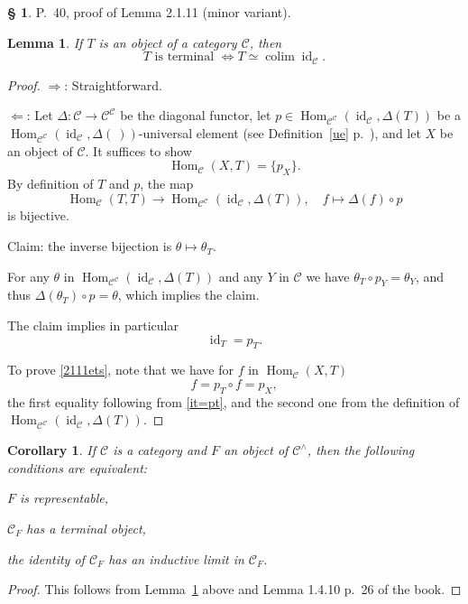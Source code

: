 \documentclass[12pt]{article}
\newtheorem{lem}[thm]{Lemma}
\newtheorem{cor}[thm]{Corollary}
\theoremstyle{remark}
\theoremstyle{definition}
\newtheorem{s}[thm]{\S}
\newcommand{\nn}{\noindent}
\newcommand{\C}{\mathcal C}
\newcommand{\si}{\Leftarrow}
\newcommand{\ssi}{\Leftrightarrow}
\newcommand{\then}{\Rightarrow}
\DeclareMathOperator*{\colim}{colim}
\DeclareMathOperator{\id}{id}
\DeclareMathOperator{\Hom}{Hom}
\begin{document}
\begin{s} 
P.~40, proof of Lemma 2.1.11 (minor variant).

\begin{lem}\label{l2111}
If $T$ is an object of a category $\C$, then 
$$
T\text{ is terminal }\ssi T\simeq\colim\id_\C.
$$
\end{lem}

\begin{proof} $\then$: Straightforward.

\nn$\si$: Let $\Delta:\C\to\C^\C$ be the diagonal functor, let $p\in\Hom_{\C^\C}(\id_\C,\Delta(T))$ be a $\Hom_{\C^\C}(\id_\C,\Delta(\ ))$\--universal element  (see Definition~\ref{ue} p.~\pageref{ue}), and let $X$ be an object of $\C$. It suffices to show 
%
\begin{equation}\label{2111ets}
\Hom_\C(X,T)=\{p_X\}.
\end{equation}
% 
By definition of $T$ and $p$, the map 
$$
\Hom_\C(T,T)\to\Hom_{\C^\C}(\id_\C,\Delta(T)),\quad f\mapsto\Delta(f)\circ p 
$$ 
is bijective. 

Claim: the inverse bijection is $\theta\mapsto\theta_T$. 

For any $\theta$ in $\Hom_{\C^\C}(\id_\C,\Delta(T))$ and any $Y$ in $\C$ we have $\theta_T\circ p_Y=\theta_Y$, and thus $\Delta(\theta_T)\circ p=\theta$, which implies the claim. 

The claim implies in particular 
%
\begin{equation}\label{it=pt}
\id_T=p_T.
\end{equation}

To prove \eqref{2111ets}, note that we have for $f$ in $\Hom_\C(X,T)$
$$
f=p_T\circ f=p_X,
$$
the first equality following from \eqref{it=pt}, and the second one from the definition of $\Hom_{\C^\C}(\id_\C,\Delta(T))$.
\end{proof}

\begin{cor}\label{c2111}
If $\C$ is a category and $F$ an object of $\C^\wedge$, then the following conditions are equivalent:

\nn{\em(a)} $F$ is representable,

\nn{\em(b)} $\C_F$ has a terminal object,

\nn{\em(c)} the identity of $\C_F$ has an inductive limit in $\C_F$.
\end{cor}

\begin{proof}
This follows from Lemma~\ref{l2111} above and Lemma 1.4.10 p.~26 of the book.
\end{proof}
\end{s}
\end{document}
